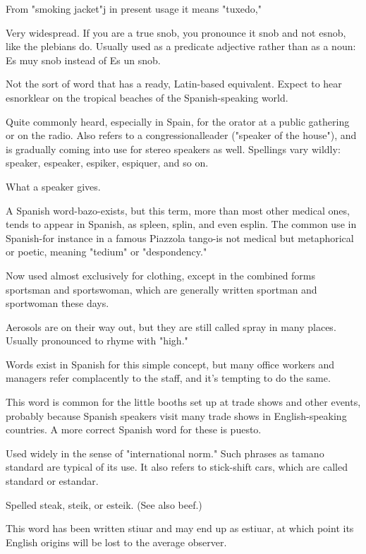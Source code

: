  From "smoking jacket"j in present usage it means
"tuxedo,"

 Very widespread. If you are a true snob, you pronounce
it snob and not esnob, like the plebians do. Usually used as a predicate
adjective rather than as a noun: Es muy snob instead of Es un snob.

 Not the sort of word that has a ready, Latin-based
equivalent. Expect to hear esnorklear on the tropical beaches of the
Spanish-speaking world.

 Quite commonly heard, especially in Spain, for
the orator at a public gathering or on the radio. Also refers to a congressionalleader ("speaker of the house"), and is gradually coming
into use for stereo speakers as well. Spellings vary wildly: speaker,
espeaker, espiker, espiquer, and so on.

 What a speaker gives.

 A Spanish word-bazo-exists, but this term, more
than most other medical ones, tends to appear in Spanish, as spleen,
splin, and even esplin. The common use in Spanish-for instance in
a famous Piazzola tango-is not medical but metaphorical or poetic,
meaning "tedium" or "despondency."

 Now used almost exclusively for clothing, except in
the combined forms sportsman and sportswoman, which are generally
written sportman and sportwoman these days.

 Aerosols are on their way out, but they are still called
spray in many places. Usually pronounced to rhyme with "high."

 Words exist in Spanish for this simple concept, but
many office workers and managers refer complacently to the staff, and
it's tempting to do the same.

 This word is common for the little booths set up at
trade shows and other events, probably because Spanish speakers visit
many trade shows in English-speaking countries. A more correct Spanish word for these is puesto.

 Used widely in the sense of "international
norm." Such phrases as tamano standard are typical of its use. It
also refers to stick-shift cars, which are called standard or estandar.

 Spelled steak, steik, or esteik. (See also beef.)

 This word has been written stiuar and may end up
as estiuar, at which point its English origins will be lost to the average
observer.

